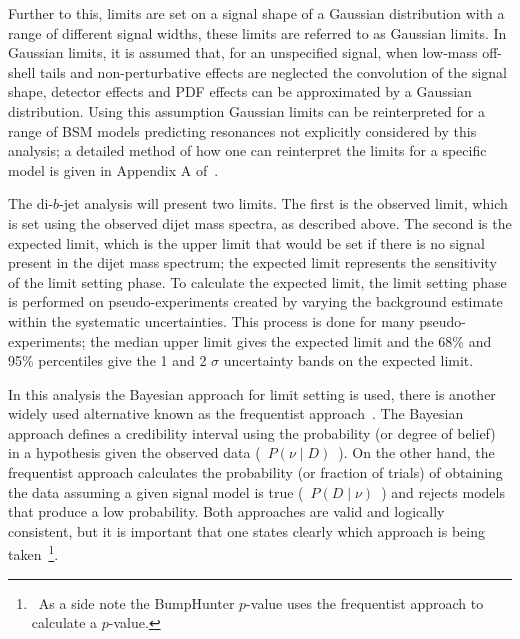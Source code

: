Further to this, limits are set on a signal shape of a Gaussian distribution with a range of different signal widths,
these limits are referred to as Gaussian limits.
In Gaussian limits, it is assumed that, for an unspecified signal,
when low-mass off-shell tails and non-perturbative effects are neglected the convolution of the signal shape, detector effects and PDF effects
can be approximated by a Gaussian distribution.
Using this assumption Gaussian limits can be reinterpreted for a range of BSM models predicting resonances not explicitly considered by this analysis;
a detailed method of how one can reinterpret the limits for a specific model is given in Appendix A of~\cite{lim-dijet-gaussian}.

The di-$b$-jet analysis will present two limits.
The first is the observed limit, which is set using the observed dijet mass spectra, as described above.
The second is the expected limit, which is the upper limit that would be set if there is no signal present in the dijet mass spectrum;
the expected limit represents the sensitivity of the limit setting phase.
To calculate the expected limit, the limit setting phase is performed on pseudo-experiments
created by varying the background estimate within the systematic uncertainties.
This process is done for many pseudo-experiments; the median upper limit gives the expected limit
and the 68\% and 95\% percentiles give the 1 and 2 $\sigma$ uncertainty bands on the expected limit.

In this analysis the Bayesian approach for limit setting is used,
there is another widely used alternative known as the frequentist approach~\cite{lim-cowan}.
The Bayesian approach defines a credibility interval using the probability (or degree of belief) in a hypothesis given the observed data \mbox{( $P(\nu \mid D)$ )}.
On the other hand, the frequentist approach calculates the probability (or fraction of trials)
of obtaining the data assuming a given signal model is true \mbox{( $P(D \mid \nu)$ )} and rejects models that produce a low probability.
Both approaches are valid and logically consistent,
but it is important that one states clearly which approach is being taken~\footnote{\ As a side note the BumpHunter $p$-value uses the frequentist approach to calculate a $p$-value.}.

